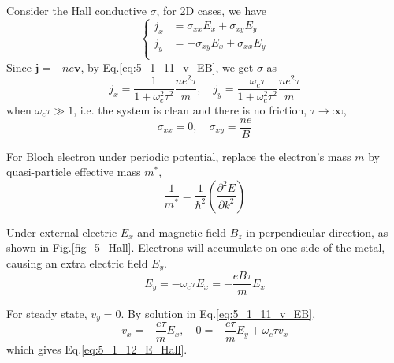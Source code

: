 \documentclass[12pt,a4paper]{article}
\begin{document}
    \begin{prop}
        Consider the Hall conductive $\sigma$, for 2D cases, we have
        \[ \left\{\begin{aligned}
            j_x & = \sigma_{xx} E_x + \sigma_{xy} E_y \\
            j_y & = -\sigma_{xy} E_x + \sigma_{xx} E_y \\
        \end{aligned}
        \right.\]
        Since $\mathbf{j} = -ne \mathbf{v}$, by Eq.\eqref{eq:5_1_11_v_EB}, we get $\sigma$ as
        \begin{equation}
            j_x = \frac{1}{1+\omega_c^2\tau^2} \frac{ne^2\tau}{m}, \quad
            j_y = \frac{\omega_c \tau}{1+\omega_c^2\tau^2} \frac{ne^2\tau}{m}
        \end{equation}
        when $\omega_c\tau \gg 1$, i.e. the system is clean and there is no friction, $\tau\to\infty$,
        \begin{equation}
        \label{eq:sigma}
            \sigma_{xx} = 0, \quad
            \sigma_{xy} = \frac{ne}{B}
        \end{equation}
    \end{prop}

    \begin{rem}
        For Bloch electron under periodic potential, replace the electron's mass $m$ by quasi-particle effective mass $m^*$,
        \[
            \frac{1}{m^*} = \frac{1}{\hbar^2} \left(\frac{\partial^2 E}{\partial k^2 } \right)
        \]
    \end{rem}

    \begin{thm} 
        Under external electric $E_x$ and magnetic field $B_z$ in perpendicular direction, as shown in Fig.\ref{fig_5_Hall}. Electrons will accumulate on one side of the metal, causing an extra electric field $E_y$.
        \begin{equation}
            E_y = -\omega_c \tau E_x = - \frac{eB\tau}{m} E_x
        \label{eq:5_1_12_E_Hall}
        \end{equation}
    \end{thm}
    \begin{prf}
        For steady state, $v_y=0$. By solution in Eq.\eqref{eq:5_1_11_v_EB},
        \[v_x = - \frac{e\tau}{m} E_x , \quad
        0 = - \frac{e\tau}{m} E_y + \omega_c \tau v_x \]
        which gives Eq.\eqref{eq:5_1_12_E_Hall}.
    \end{prf}
\end{document}
